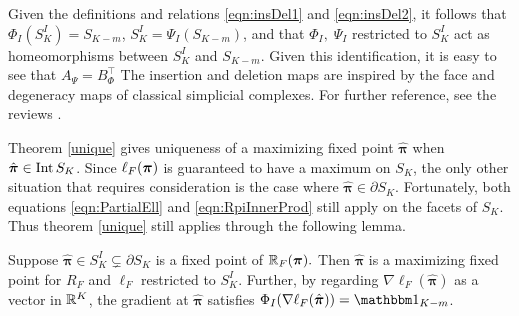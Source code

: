 \begin{rk}
	Given the definitions and relations \eqref{eqn:insDel1} and \eqref{eqn:insDel2}, it follows that \( \Phi_I(S_K^{I}) = S_{K-m} \), \( S_K^{I} = \Psi_I(S_{K-m}) \), and that \( \Phi_I,\;\Psi_I \) restricted to \( S_K^I \) act as homeomorphisms between \( S_K^{I} \) and \( S_{K-m} \).  Given this identification, it is easy to see that \( A_{\Psi} = B_{\Phi}^{\intercal} \)  The insertion and deletion maps are inspired by the face and degeneracy maps of classical simplicial complexes. For further reference, see the reviews \cite{friedman2012survey,nlab:simplex,nlab:simplex_category}.
	
\end{rk}

Theorem \ref{unique} gives uniqueness of a maximizing fixed point \( \hat{\bm \pi} \) when \( \hat{\bm \pi} \in \operatorname{Int}S_K\). Since \( \ell_{F}({\bm\pi}) \) is guaranteed to have a maximum on \( S_K \), the only other situation that requires consideration is the case where \( \hat{\bm \pi}\in\partial S_K \).  Fortunately, both equations \ref{eqn:PartialEll} and \ref{eqn:RpiInnerProd} still apply on the facets of \( S_K \). Thus theorem \ref{unique} still applies through the following lemma.


\begin{lemm}\label{lemm:faceDegenerate}
Suppose \( \hat{\bm \pi}\in S_K^I\subsetneq\partial S_K \) is a fixed point of \( \mathbb R_F(\bm\pi). \) Then \( \hat{\bm\pi} \) is a maximizing fixed point for  \( R_F \) and \( \ell_{F} \) restricted to \( S_K^I \).  Further, by regarding \( \nabla\ell_{F}(\hat{\bm\pi}) \) as a vector in \( \mathbb R^K \), the gradient at \( \hat{\bm\pi} \) satisfies \( \Phi_I(\nabla \ell_{F}(\hat{\bm\pi}))=\mathbbm 1_{K-m} \).
\end{lemm}


